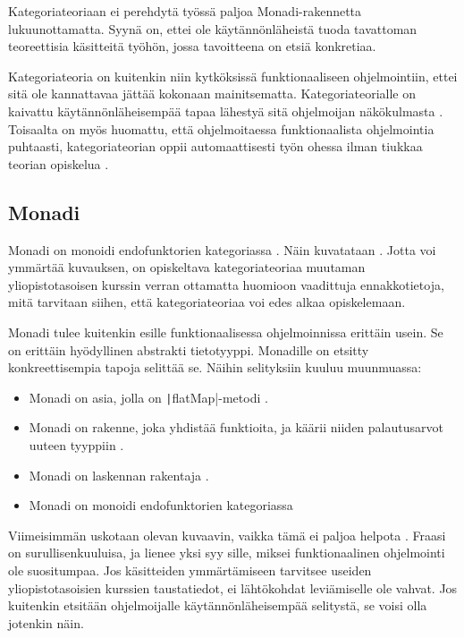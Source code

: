 Kategoriateoriaan ei perehdytä työssä paljoa Monadi-rakennetta lukuunottamatta. Syynä on, ettei ole käytännönläheistä tuoda tavattoman teoreettisia käsitteitä työhön, jossa tavoitteena on etsiä konkretiaa.

Kategoriateoria on kuitenkin niin kytköksissä funktionaaliseen ohjelmointiin, ettei sitä ole kannattavaa jättää kokonaan mainitsematta. Kategoriateorialle on kaivattu käytännönläheisempää tapaa lähestyä sitä ohjelmoijan näkökulmasta \cite{holvikari2021category}. Toisaalta on myös huomattu, että ohjelmoitaessa funktionaalista ohjelmointia puhtaasti, kategoriateorian oppii automaattisesti työn ohessa ilman tiukkaa teorian opiskelua \cite{holvikari2021category}.

\subsection{Monadi}

Monadi on monoidi endofunktorien kategoriassa \cite{bartosz_category_for_progamers_10}. Näin kuvatataan . Jotta voi ymmärtää kuvauksen, on opiskeltava kategoriateoriaa muutaman yliopistotasoisen kurssin verran ottamatta huomioon vaadittuja ennakkotietoja, mitä tarvitaan siihen, että kategoriateoriaa voi edes alkaa opiskelemaan.

Monadi tulee kuitenkin esille funktionaalisessa ohjelmoinnissa erittäin usein. Se on erittäin hyödyllinen abstrakti tietotyyppi. Monadille on etsitty konkreettisempia tapoja selittää se. Näihin selityksiin kuuluu muunmuassa:

\begin{itemize}
    \item Monadi on asia, jolla on \texttt|flatMap|-metodi \cite{stackoverflow_flatmap_monad}.
    \item Monadi on rakenne, joka yhdistää funktioita, ja käärii niiden palautusarvot uuteen tyyppiin \cite{monad_wikipedia}.
    \item Monadi on laskennan rakentaja \cite{stackoverflow_what_monad}.
    \item Monadi on monoidi endofunktorien kategoriassa \cite{bartosz_category_for_progamers_10,monad_wikipedia,stackoverflow_what_monad}
\end{itemize}


Viimeisimmän uskotaan olevan kuvaavin, vaikka tämä ei paljoa helpota \cite{stackoverflow_what_monad}. Fraasi on surullisenkuuluisa, ja lienee yksi syy sille, miksei funktionaalinen ohjelmointi ole suositumpaa. Jos käsitteiden ymmärtämiseen tarvitsee useiden yliopistotasoisien kurssien taustatiedot, ei lähtökohdat leviämiselle ole vahvat. Jos kuitenkin etsitään ohjelmoijalle käytännönläheisempää selitystä, se voisi olla jotenkin näin.

